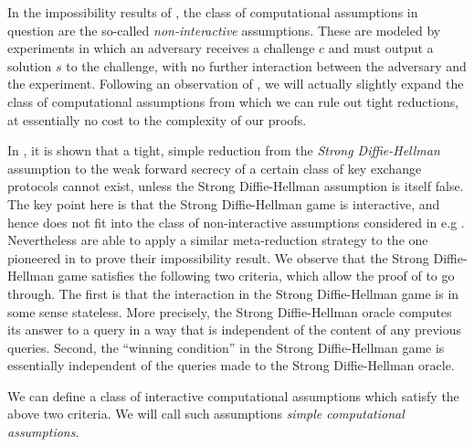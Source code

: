 In the impossibility results of , the class of computational assumptions
in question are the so-called \emph{non-interactive} assumptions.
These are modeled by experiments in which an adversary receives a challenge \(c\)
and must output a solution \(s\) to the challenge, with no further interaction between the adversary and the experiment.
Following an observation of , we will actually slightly expand the class of computational assumptions
from which we can rule out tight reductions, at essentially no cost to the complexity of our proofs.

In , it is shown that a tight, simple reduction from the \emph{Strong Diffie-Hellman} assumption
to the weak forward secrecy of a certain class of key exchange protocols cannot exist,
unless the Strong Diffie-Hellman assumption is itself false.
The key point here is that the Strong Diffie-Hellman game is interactive,
and hence does not fit into the class of non-interactive assumptions considered in e.g .
Nevertheless  are able to apply a similar meta-reduction strategy
to the one pioneered in  to prove their impossibility result.
We observe that the Strong Diffie-Hellman game satisfies the following two criteria,
which allow the proof of  to go through.
The first is that the interaction in the Strong Diffie-Hellman game is in some sense stateless.
More precisely, the Strong Diffie-Hellman oracle computes its answer to a query
in a way that is independent of the content of any previous queries.
Second, the ``winning condition'' in the Strong Diffie-Hellman game is essentially independent of
the queries made to the Strong Diffie-Hellman oracle.

We can define a class of interactive computational assumptions which satisfy the above two criteria.
We will call such assumptions \emph{simple computational assumptions}.

